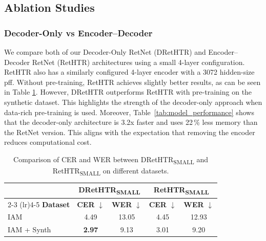 \documentclass[times, review, 10pt]{elsarticle}
\begin{document}
\subsection{Ablation Studies}
\label{sec:ablation}
\subsubsection{Decoder-Only vs Encoder–Decoder}
We compare both of our Decoder-Only RetNet (DRetHTR) and Encoder–Decoder RetNet (RetHTR) architectures using a small 4-layer configuration. RetHTR also has a similarly configured 4-layer encoder with a 3072 hidden-size \ac{pff}. Without pre-training, RetHTR achieves slightly better results, as can be seen in Table \ref{tab:comparison}. However, DRetHTR outperforms RetHTR with pre-training on the synthetic dataset. This highlights the strength of the decoder-only approach when data-rich pre-training is used. Moreover, Table~\ref{tab:model_performance} shows that the decoder-only architecture is 3.2x faster and uses 22\,\% less memory than the RetNet version. This aligns with the expectation that removing the encoder reduces computational cost.

\begin{table}[t]
\centering
\caption{Comparison of CER and WER between DRetHTR\textsubscript{SMALL} and RetHTR\textsubscript{SMALL} on different datasets.}
\begingroup
\setlength{\tabcolsep}{5pt} %
\label{tab:comparison}
{\small
\begin{tabular}{@{}lcccc@{}}
\toprule
 & \multicolumn{2}{c}{\textbf{DRetHTR\textsubscript{SMALL}}} & \multicolumn{2}{c}{\textbf{RetHTR\textsubscript{SMALL}}} \\
\cmidrule(lr){2-3} \cmidrule(lr){4-5}
\textbf{Dataset} & \textbf{CER} $\downarrow$ & \textbf{WER} $\downarrow$ & \textbf{CER} $\downarrow$ & \textbf{WER} $\downarrow$ \\
\midrule
IAM         & 4.49            & 13.05           & 4.45            & 12.93 \\
IAM + Synth & \textbf{2.97}   & \phantom{1}9.13 & 3.01            & \phantom{1}9.20 \\
\bottomrule
\end{tabular}
}
\endgroup
\end{table}
\vspace{6pt}
\end{document}
